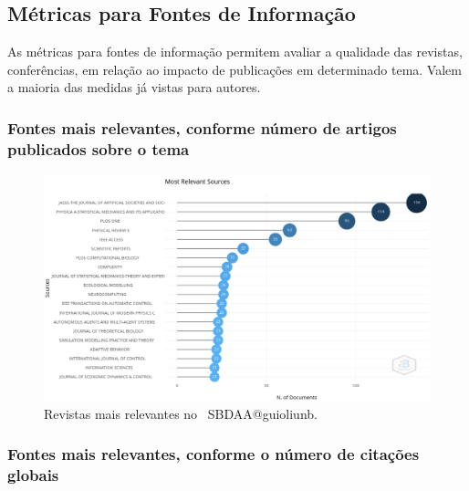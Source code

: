\subsection{Métricas para Fontes de Informação}

As métricas para fontes de informação permitem avaliar a qualidade das revistas, conferências, em relação ao impacto de publicações em determinado tema. Valem a maioria das medidas já vistas para autores.

\subsubsection{Fontes mais relevantes, conforme número de artigos publicados sobre o tema}

\begin{figure}
    \centering
    \includegraphics[width=1\textwidth]{experiments/jhcf/PesqBibliogr/SimulacaoMultiagente/WoS-20220203/Metricas/Sources/MASSA2-Most-Relevant-Sources.png}
    \caption{Revistas mais relevantes no  \dataset\ SBDAA@guioliunb.}
    \label{fig:MASSA2-Most-Relevant-Sources}
\end{figure}

\subsubsection{Fontes mais relevantes, conforme o número de citações globais}

